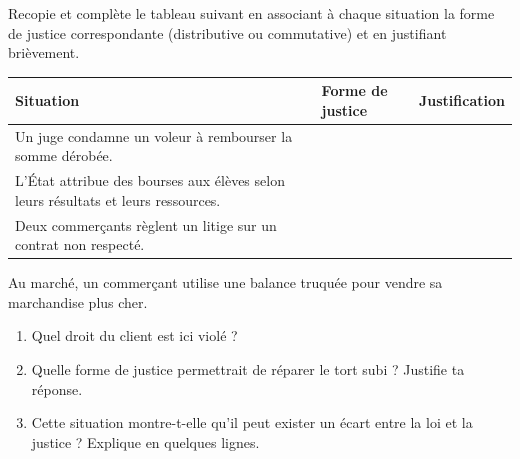 \documentclass[11pt]{article}
\begin{document}
\begin{exercice}
Recopie et complète le tableau suivant en associant à chaque situation la forme de justice correspondante (distributive ou commutative) et en justifiant brièvement.
\begin{center}
\begin{tabular}{|p{6cm}|p{4cm}|p{4cm}|}
\hline
\textbf{Situation} & \textbf{Forme de justice} & \textbf{Justification} \\
\hline
Un juge condamne un voleur à rembourser la somme dérobée. & & \\
\hline
L'État attribue des bourses aux élèves selon leurs résultats et leurs ressources. & & \\
\hline
Deux commerçants règlent un litige sur un contrat non respecté. & & \\
\hline
\end{tabular}
\end{center}
\end{exercice}

\begin{exercice}
Au marché, un commerçant utilise une balance truquée pour vendre sa marchandise plus cher.
\begin{enumerate}
  \item Quel droit du client est ici violé ?
  \item Quelle forme de justice permettrait de réparer le tort subi ? Justifie ta réponse.
  \item Cette situation montre-t-elle qu'il peut exister un écart entre la loi et la justice ? Explique en quelques lignes.
\end{enumerate}
\end{exercice}
\end{document}

